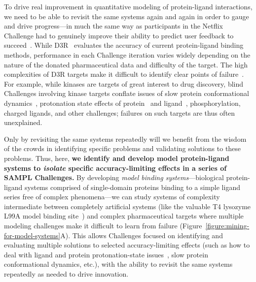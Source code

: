 \documentclass[11pt]{article}
\begin{document}
To drive real improvement in quantitative modeling of protein-ligand interactions, we need to be able to revisit the same systems again and again in order to gauge and drive progress---in much the same way as participants in the Netflix Challenge had to genuinely improve their ability to predict user feedback to succeed~\cite{Bell:2010:CHANCE}.
While D3R~\cite{Gathiaka:2016:JComputAidedMolDes} evaluates the accuracy of current protein-ligand binding methods, performance in each Challenge iteration varies widely depending on the nature of the donated pharmaceutical data and difficulty of the target.
The high complexities of D3R targets make it difficult to identify clear points of failure~\cite{ignjatovic_binding-affinity_2016, deng_large_2016, sunseri_d3r_2016, Gathiaka:2016:JComputAidedMolDes}.
For example, while kinases are targets of great interest to drug discovery, blind Challenges involving kinase targets conflate issues of slow protein conformational dynamics~\cite{Lin:2013:Proc.Natl.Acad.Sci.}, protonation state effects of protein~\cite{Shan:2009:PNAS} and ligand~\cite{Szakacs:2005:JournalofMedicinalChemistry,Grante:2014:SpectrochimicaActaPartA:MolecularandBiomolecularSpectroscopy}, phosphorylation, charged ligands, and other challenges; failures on such targets are thus often unexplained. 

Only by revisiting the same systems repeatedly will we benefit from the wisdom of the crowds in identifying specific problems and validating solutions to these problems. 
Thus, here, {\bf we identify and develop model protein-ligand systems to \emph{isolate} specific accuracy-limiting effects in a series of SAMPL Challenges.}
By developing \emph{model binding systems}---biological protein-ligand systems comprised of single-domain proteins binding to a simple ligand series free of complex phenomena---we can study systems of complexity intermediate between completely artificial systems (like the valuable T4 lysozyme L99A model binding site~\cite{mobley_predicting_2007,merski_homologous_2015, Mobley:2017:AnnualReviewofBiophysics}) and complex pharmaceutical targets where multiple modeling challenges make it difficult to learn from failure (Figure~\ref{figure:mining-for-model-systems}A).
This allows Challenges focused on identifying and evaluating multiple solutions to selected accuracy-limiting effects (such as how to deal with ligand and protein protonation-state issues~\cite{Onufriev:2013:QuarterlyReviewsofBiophysics}, slow protein conformational dynamics, etc.), with the ability to revisit the same systems repeatedly as needed to drive innovation.
\end{document}
